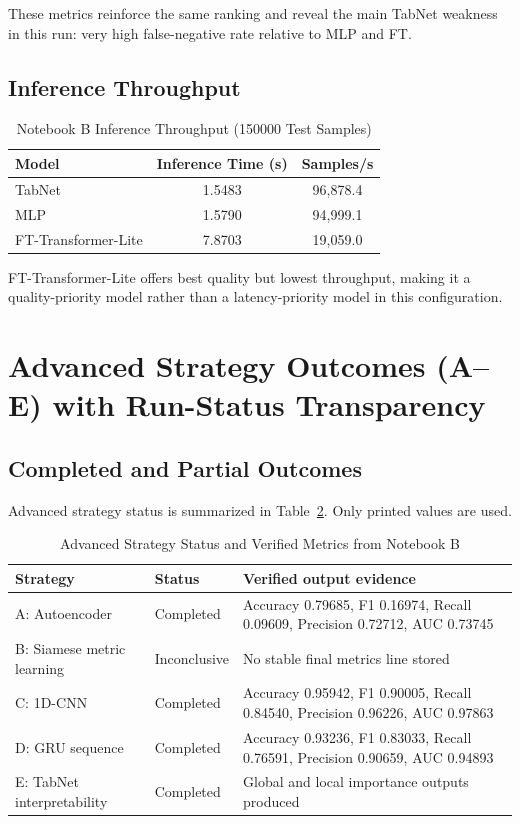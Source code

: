\documentclass[10pt,journal]{IEEEtran}
\begin{document}
These metrics reinforce the same ranking and reveal the main TabNet weakness in this run: very high false-negative rate relative to MLP and FT.

\subsection{Inference Throughput}
\begin{table}[!t]
\caption{Notebook B Inference Throughput (\num{150000} Test Samples)}
\label{tab:dl_speed}
\centering
\begin{tabular}{lcc}
\toprule
Model & Inference Time (s) & Samples/s \\
\midrule
TabNet & 1.5483 & 96,878.4 \\
MLP & 1.5790 & 94,999.1 \\
FT-Transformer-Lite & 7.8703 & 19,059.0 \\
\bottomrule
\end{tabular}
\end{table}

FT-Transformer-Lite offers best quality but lowest throughput, making it a quality-priority model rather than a latency-priority model in this configuration.

\section{Advanced Strategy Outcomes (A--E) with Run-Status Transparency}
\subsection{Completed and Partial Outcomes}
Advanced strategy status is summarized in Table~\ref{tab:advanced_status}. Only printed values are used.

\begin{table}[!t]
\caption{Advanced Strategy Status and Verified Metrics from Notebook B}
\label{tab:advanced_status}
\centering
\begin{tabular}{p{3.0cm}p{2.1cm}p{9.8cm}}
\toprule
Strategy & Status & Verified output evidence \\
\midrule
A: Autoencoder & Completed & Accuracy 0.79685, F1 0.16974, Recall 0.09609, Precision 0.72712, AUC 0.73745 \\
B: Siamese metric learning & Inconclusive & No stable final metrics line stored \\
C: 1D-CNN & Completed & Accuracy 0.95942, F1 0.90005, Recall 0.84540, Precision 0.96226, AUC 0.97863 \\
D: GRU sequence & Completed & Accuracy 0.93236, F1 0.83033, Recall 0.76591, Precision 0.90659, AUC 0.94893 \\
E: TabNet interpretability & Completed & Global and local importance outputs produced \\
\bottomrule
\end{tabular}
\end{table}
\end{document}
